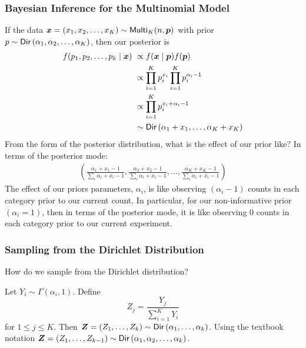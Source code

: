 \subsubsection*{Bayesian Inference for the Multinomial Model}

If the data $\bm{x} = \left( x_1 , x_2 , \ldots , x_K \right) \sim {\sf Multi}_K (n,\bm{p})$ with prior $p \sim {\sf Dir} \left( \alpha_1 , \alpha_2 , \ldots , \alpha_K \right)$, then our posterior is
\begin{align*}
    f ( p_1 , p_2 , \ldots , p_k \mid \bm{x} ) \
     & \propto f (\bm{x} \mid \bm{p}) f(\bm{p})                           \\
     & \propto \prod_{i=1}^{K} p_i^{x_i} \prod_{i=1}^{K} p_i^{\alpha_i-1} \\
     & \propto \prod_{i=1}^{K} p_i^{x_i + \alpha_i - 1}                   \\
     & \sim {\sf Dir} \left( \alpha_1 + x_1, \ldots , \alpha_K + x_K \right)
\end{align*}
From the form of the posterior distribution, what is the effect of our prior like? In terms of the posterior mode:
\begin{align*}
    \left( \frac{\alpha_1 + x_1 - 1}{\sum_i \alpha_i + x_i - 1}, \frac{\alpha_2 + x_2 - 1}{\sum_i \alpha_i + x_i - 1}, \ldots , \frac{\alpha_K + x_K - 1}{\sum_i \alpha_i + x_i - 1} \right)
\end{align*}
The effect of our priors parameters, $\alpha_i$, is like observing $(\alpha_i - 1)$ counts in each category prior to our current count. In particular, for our non-informative prior $(\alpha_i = 1)$, then in terms of the posterior mode, it is like observing $0$ counts in each category prior to our current experiment.

\subsubsection*{Sampling from the Dirichlet Distribution}

How do we sample from the Dirichlet distribution?

\begin{thm} \label{thm: samp_Dirichlet}
    Let $Y_i \sim \Gamma (\alpha_i , 1)$. Define
    \[
        Z_j = \frac{Y_j}{\sum_{i=1}^K Y_i}
    \]
    for $1 \leq j \leq K$. Then $\bm{Z} = \left( Z_1 , \ldots , Z_k \right) \sim {\sf Dir} \left( \alpha_1 , \ldots , \alpha_k \right)$. Using the textbook notation $\bm{Z} = \left( Z_1 , \ldots , Z_{k-1} \right) \sim {\sf Dir} \left( \alpha_1 , \alpha_2 , \ldots , \alpha_k \right)$.
\end{thm}

